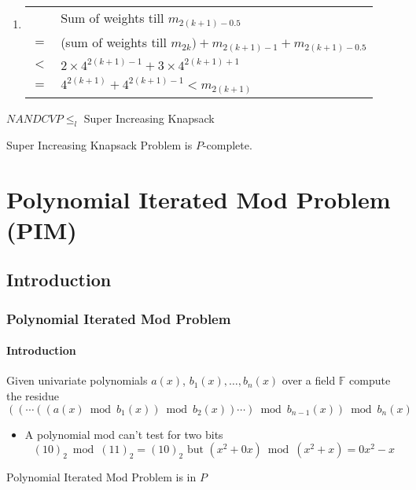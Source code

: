 \documentclass[article,10pt]{beamer}%
\newcommand{\bbF}{\mathbb{F}}
\begin{document}
\begin{frame}[allowframebreaks]
\begin{enumerate}
		\item \begin{tabular}[t]{rl}
			& Sum of weights till $m_{2(k+1)-0.5}$ \\
			$=$ & (sum of weights till $m_{2k})+m_{2(k+1)-1}+m_{2(k+1)-0.5}$\\
			 $<$ & $2\times 4^{2(k+1)-1}+3\times 4^{2(k+1)+1}$\\
			 $=$ & $ 4^{2(k+1)}+4^{2(k+1)-1}<m_{2(k+1)}$
		\end{tabular}
	\end{enumerate}


\framebreak

\begin{theorem}
	$NANDCVP\leq_l$ Super Increasing Knapsack
\end{theorem}\vspace{5mm}

\begin{theorem}
	Super Increasing Knapsack Problem is $P$-complete.
\end{theorem}
\end{frame}

\section{Polynomial Iterated Mod Problem (PIM)}
\subsection{Introduction}
\begin{frame}
\frametitle{Polynomial Iterated Mod Problem}
\framesubtitle{Introduction}
\begin{definition}
	Given univariate polynomials $a(x)$, $b_1(x),\dots, b_n(x)$ over a field $\bbF$ compute the residue $((\cdots ((a(x)\bmod{b_1(x)})\bmod{b_2(x)})\cdots)\bmod{b_{n-1}(x)})\bmod{b_{n}(x)}$
\end{definition}
\begin{itemize}
	\item A polynomial mod can't test for two bits $$(10)_2\bmod{(11)_2}=(10)_2\text{ but }(x^2+0 x)\bmod{(x^2+x)}=0x^2-x$$
\end{itemize}
\begin{theorem}
	Polynomial Iterated Mod Problem is in $P$
\end{theorem}
\end{frame}
\end{document}
